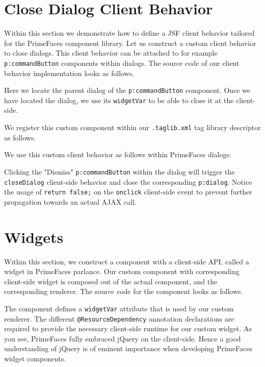 \section{Close Dialog Client Behavior}
Within this section we demonstrate how to define a JSF client behavior tailored for the PrimeFaces component library.
Let us construct a custom client behavior to close dialogs.
This client behavior can be attached to for example \texttt{p:commandButton} components within dialogs.
The source code of our client behavior implementation looks as follows.

Here we locate the parent dialog of the \texttt{p:commandButton} component.
Once we have located the dialog, we use its \texttt{widgetVar} to be able to close it at the client-side.

We register this custom component within our \texttt{.taglib.xml} tag library descriptor as follows.


We use this custom client behavior as follows within PrimeFaces dialogs:

Clicking the "Dismiss" \texttt{p:commandButton} within the dialog will trigger the \texttt{closeDialog} client-side behavior and close the corresponding \texttt{p:dialog}.
Notice the usage of \texttt{return false;} on the \texttt{onclick} client-side event to prevent further propagation towards an actual AJAX call.

\section{Widgets}
Within this section, we construct a component with a client-side API, called a widget in PrimeFaces parlance.
Our custom component with corresponding client-side widget is composed out of the actual component, and the corresponding renderer.
The source code for the component looks as follows.

The component defines a \texttt{widgetVar} attribute that is used by our custom renderer.
The different \texttt{@ResourceDependency} annotation declarations are required to provide the necessary client-side runtime for our custom widget.
As you see, PrimeFaces fully embraced jQuery \cite{jQuery} on the client-side.
Hence a good understanding of jQuery is of eminent importance when developing PrimeFaces widget components.

